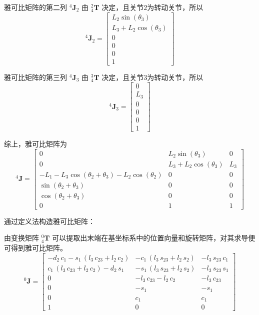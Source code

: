 \documentclass{homework}
\begin{document}
\begin{sol}
雅可比矩阵的第二列 $ {^4}\mathbf{J}_2 $ 由 $ _4^2\mathbf{T} $ 决定，且关节2为转动关节，所以
\[
  {^4}\mathbf{J}_2 =
  \begin{bmatrix}
    L_2 \sin(\theta_3) \\
    L_3 + L_2 \cos(\theta_3) \\
    0 \\
    0 \\
    0 \\
    1
  \end{bmatrix}
\]

雅可比矩阵的第三列 $ {^4}\mathbf{J}_3 $ 由 $ _4^3\mathbf{T} $ 决定，且关节3为转动关节，所以
\[
  {^4}\mathbf{J}_3 =
  \begin{bmatrix}
    0 \\
    L_3 \\
    0 \\
    0 \\
    0 \\
    1
  \end{bmatrix}
\]

综上，雅可比矩阵为
\[
  {^4}\mathbf{J} =
  \begin{bmatrix}
    0 & L_2 \sin(\theta_3) & 0 \\
    0 & L_3 + L_2 \cos(\theta_3) & L_3 \\
    - L_1 - L_3 \cos(\theta_2 + \theta_3) - L_2 \cos(\theta_2) & 0 & 0 \\
    \sin(\theta_2 + \theta_3) & 0 & 0 \\
    \cos(\theta_2 + \theta_3) & 0 & 0 \\
    0 & 1 & 1
  \end{bmatrix}
\]

通过定义法构造雅可比矩阵：

由变换矩阵 $ _4^0\mathbf{T} $ 可以提取出末端在基坐标系中的位置向量和旋转矩阵，对其求导便可得到雅可比矩阵。
\[
  {^0}\mathbf{J} =
  \begin{bmatrix} 
    -d_{2}\,c_{1}-s_{1}\,\left(l_{3}\,c_{23}+l_{2}\,c_{2}\right) & -c_{1}\,\left(l_{3}\,s_{23}+l_{2}\,s_{2}\right) & -l_{3}\,s_{23}\,c_{1} \\ 
    c_{1}\,\left(l_{3}\,c_{23}+l_{2}\,c_{2}\right)-d_{2}\,s_{1} & -s_{1}\,\left(l_{3}\,s_{23}+l_{2}\,s_{2}\right) & -l_{3}\,s_{23}\,s_{1} \\ 
    0 & -l_{3}\,c_{23}-l_{2}\,c_{2} & -l_{3}\,c_{23} \\ 
    0 & -s_{1} & -s_{1} \\ 
    0 & c_{1} & c_{1} \\ 
    1 & 0 & 0
  \end{bmatrix}
\]


\end{sol}
\end{document}
